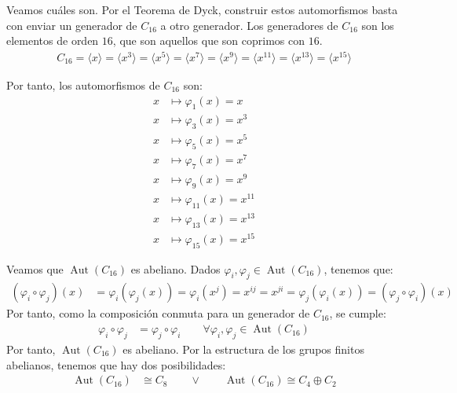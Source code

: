 \documentclass[12pt]{article}
\DeclareMathOperator{\Aut}{Aut}
\begin{document}
\begin{ejercicio}
\begin{enumerate}
            Veamos cuáles son. Por el Teorema de Dyck, construir estos automorfismos basta con enviar un generador de $C_{16}$ a otro generador. Los generadores de $C_{16}$ son los elementos de orden $16$, que son aquellos que son coprimos con $16$.
            \begin{align*}
                C_16 = \langle x\rangle
                = \langle x^3\rangle
                = \langle x^5\rangle
                = \langle x^7\rangle
                = \langle x^9\rangle
                = \langle x^{11}\rangle
                = \langle x^{13}\rangle
                = \langle x^{15}\rangle
            \end{align*}

            Por tanto, los automorfismos de $C_{16}$ son:
            \begin{align*}
                x &\mapsto \varphi_1(x) = x \\
                x &\mapsto \varphi_3(x) = x^3 \\
                x &\mapsto \varphi_5(x) = x^5 \\
                x &\mapsto \varphi_7(x) = x^7 \\
                x &\mapsto \varphi_9(x) = x^9 \\
                x &\mapsto \varphi_11(x) = x^{11} \\
                x &\mapsto \varphi_13(x) = x^{13} \\
                x &\mapsto \varphi_15(x) = x^{15}
            \end{align*}

            Veamos que $\Aut(C_{16})$ es abeliano. Dados $\varphi_i, \varphi_j \in \Aut(C_{16})$, tenemos que:
            \begin{align*}
                (\varphi_i \circ \varphi_j)(x) & = \varphi_i(\varphi_j(x)) = \varphi_i(x^j) = x^{ij} = x^{ji} = \varphi_j(\varphi_i(x)) = (\varphi_j \circ \varphi_i)(x)
            \end{align*}
            Por tanto, como la composición conmuta para un generador de $C_{16}$, se cumple:
            \begin{align*}
                \varphi_i \circ \varphi_j & = \varphi_j \circ \varphi_i\qquad \forall \varphi_i, \varphi_j \in \Aut(C_{16})
            \end{align*}
            Por tanto, $\Aut(C_{16})$ es abeliano. 
            Por la estructura de los grupos finitos abelianos, tenemos que hay dos posibilidades:
            \begin{align*}
                \Aut(C_{16}) & \cong C_8
                \qquad \lor \qquad
                \Aut(C_{16}) \cong C_4 \oplus C_2
            \end{align*}


\end{enumerate}
\end{ejercicio}
\end{document}
